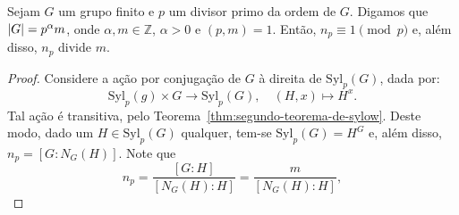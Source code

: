 \begin{theorem}[Sylow]\label{thm:terceiro-teorema-de-sylow}
  Sejam $G$ um grupo finito e $p$ um divisor primo da ordem de $G$. Digamos que $\lvert G\rvert=p^{\alpha}m$, onde $\alpha,m\in{\mathbb{Z}}$, $\alpha>0$ e $(p,m)=1$. Então, $n_{p}\equiv{1}\pmod{p}$ e, além disso, $n_{p}$ divide $m$.
\end{theorem}

\begin{proof}
  Considere a ação por conjugação de $G$ à direita de $\text{Syl}_{p}(G)$, dada por:
  \[
    \text{Syl}_{p}(g)\times{G}\to\text{Syl}_{p}(G),\quad{(H,x)\mapsto{H^{x}}}.
  \]
  Tal ação é transitiva, pelo Teorema~\ref{thm:segundo-teorema-de-sylow}. Deste modo, dado um $H\in\text{Syl}_{p}(G)$ qualquer, tem-se $\text{Syl}_{p}(G)=H^{G}$ e, além disso, $n_{p}=[G:N_{G}(H)]$. Note que
  \[
    n_{p}
    =
    \frac{[G:H]}{[N_{G}(H):H]}
    =
    \frac{m}{[N_{G}(H):H]},
  \]
\end{proof}
